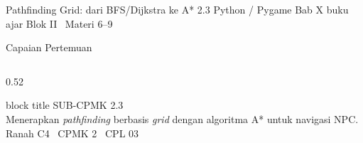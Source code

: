 \documentclass[aspectratio=169,10pt]{beamer}
\begin{document}
  {Pathfinding Grid: dari BFS/Dijkstra ke A*}
  {2.3}
  {Python / Pygame}
  {Bab X buku ajar}
  {Blok II \textperiodcentered\ Materi 6--9}

\begin{frame}{Capaian Pertemuan}
\begin{columns}[T,onlytextwidth]
  \begin{column}{0.52\textwidth}
    \begin{beamercolorbox}[wd=\linewidth,sep=5pt,rounded=true]{block title}
      {\fontsize{6.8}{8}\selectfont\color{ubHead}SUB-CPMK 2.3}\\[2pt]
      {\footnotesize Menerapkan \emph{pathfinding} berbasis \emph{grid}
       dengan algoritma A* untuk navigasi NPC.}\\[3pt]
      {\fontsize{6.6}{8}\selectfont\color{ubHead}Ranah C4 \textperiodcentered\
       CPMK 2 \textperiodcentered\ CPL 03}
    \end{beamercolorbox}
    \vspace{0.16cm}


\end{column}
\end{columns}
\end{frame}
\end{document}
